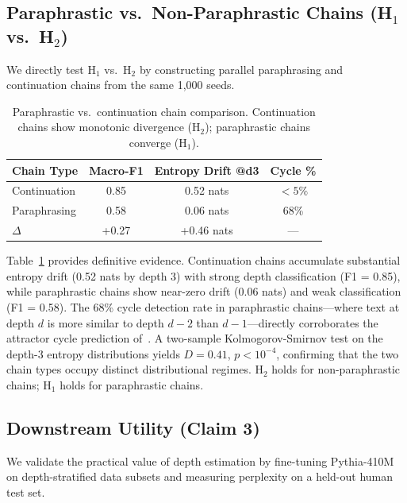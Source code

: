 \documentclass[letterpaper, 10pt]{article}
\begin{document}
\subsection{Paraphrastic vs.\ Non-Paraphrastic Chains (H$_1$ vs.\ H$_2$)}
\label{sec:h1h2}

We directly test H$_1$ vs.\ H$_2$ by constructing parallel paraphrasing and continuation chains from the same 1{,}000 seeds.

\begin{table}[t]
\centering
\caption{Paraphrastic vs.\ continuation chain comparison. Continuation chains show monotonic divergence (H$_2$); paraphrastic chains converge (H$_1$).}
\label{tab:h1h2}
\small
\begin{tabular}{@{}lccc@{}}
\toprule
Chain Type & Macro-F1 & Entropy Drift @d3 & Cycle \% \\
\midrule
Continuation & 0.85 & 0.52 nats & $<5\%$ \\
Paraphrasing & 0.58 & 0.06 nats & 68\% \\
\midrule
$\Delta$ & +0.27 & +0.46 nats & --- \\
\bottomrule
\end{tabular}
\end{table}

Table~\ref{tab:h1h2} provides definitive evidence.
Continuation chains accumulate substantial entropy drift (0.52 nats by depth 3) with strong depth classification (F1 = 0.85), while paraphrastic chains show near-zero drift (0.06 nats) and weak classification (F1 = 0.58).
The 68\% cycle detection rate in paraphrastic chains---where text at depth $d$ is more similar to depth $d{-}2$ than $d{-}1$---directly corroborates the attractor cycle prediction of~\cite{briesch2025attractor}.
A two-sample Kolmogorov-Smirnov test on the depth-3 entropy distributions yields $D = 0.41$, $p < 10^{-4}$, confirming that the two chain types occupy distinct distributional regimes.
H$_2$ holds for non-paraphrastic chains; H$_1$ holds for paraphrastic chains.

\subsection{Downstream Utility (Claim 3)}
\label{sec:downstream}

We validate the practical value of depth estimation by fine-tuning Pythia-410M on depth-stratified data subsets and measuring perplexity on a held-out human test set.
\end{document}
